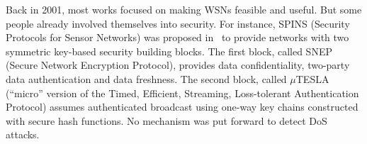 
Back in 2001, most works focused on making WSNs feasible and useful.
But some people already involved themselves into security.
For instance, SPINS (Security Protocols for Sensor Networks) was proposed in~\cite{PSWCT02} to provide networks with two symmetric key-based security building blocks.
The first block, called SNEP (Secure Network Encryption Protocol), provides data confidentiality, two-party data authentication and data freshness.
The second block, called $\mu$TESLA (``micro'' version of the Timed, Efficient, Streaming, Loss-tolerant Authentication Protocol) assumes authenticated broadcast using one-way key chains constructed with secure hash functions.
No mechanism was put forward to detect DoS attacks.




